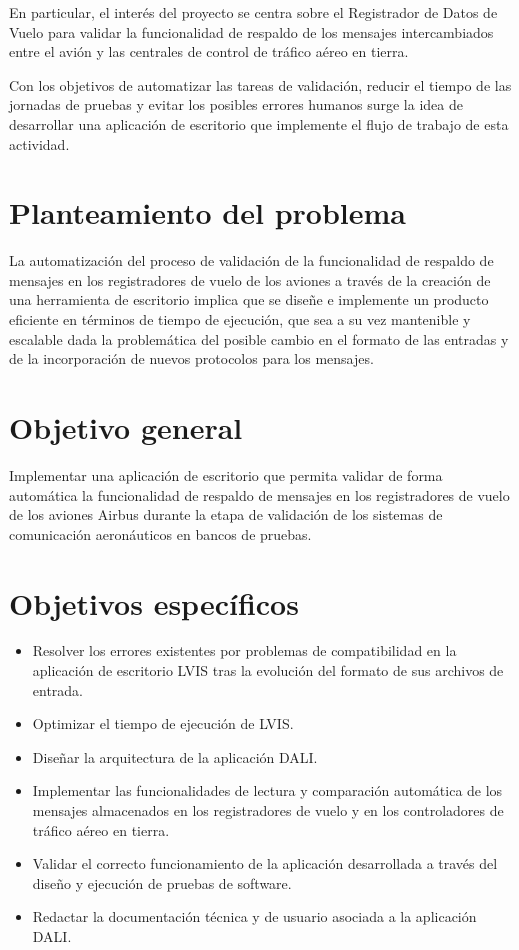 En particular, el interés del proyecto se centra sobre el Registrador de Datos de Vuelo para validar la funcionalidad de respaldo de los mensajes intercambiados entre el avión y las centrales de control de tráfico aéreo en tierra. 

Con los objetivos de automatizar las tareas de validación, reducir el tiempo de las jornadas de pruebas y evitar los posibles errores humanos surge la idea de desarrollar una aplicación de escritorio que implemente el flujo de trabajo de esta actividad. 

\section*{Planteamiento del problema}

La automatización del proceso de validación de la funcionalidad de respaldo de mensajes en los registradores de vuelo de los aviones a través de la creación de una herramienta de escritorio implica que se diseñe e implemente un producto eficiente en términos de tiempo de ejecución, que sea a su vez mantenible y escalable dada la problemática del posible cambio en el formato de las entradas y de la incorporación de nuevos protocolos para los mensajes. 

\section*{Objetivo general}

Implementar una aplicación de escritorio que permita validar de forma automática la funcionalidad de respaldo de mensajes en los registradores de vuelo de los aviones Airbus durante la etapa de validación de los sistemas de comunicación aeronáuticos en bancos de pruebas.

\section*{Objetivos específicos}

\begin{itemize}[noitemsep,nolistsep]
	\item Resolver los errores existentes por problemas de compatibilidad en la aplicación de escritorio LVIS tras la evolución del formato de sus archivos de entrada.
    \item Optimizar el tiempo de ejecución de LVIS.
    \item Diseñar la arquitectura de la aplicación DALI. 
    \item Implementar las funcionalidades de lectura y comparación automática de los mensajes almacenados en los registradores de vuelo y en los controladores de tráfico aéreo en tierra.
    \item Validar el correcto funcionamiento de la aplicación desarrollada a través del diseño y ejecución de pruebas de software.
    \item Redactar la documentación técnica y de usuario asociada a la aplicación DALI. 
\end{itemize}

